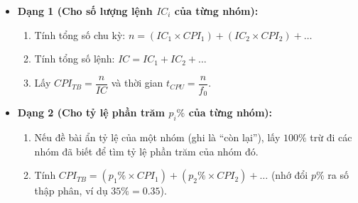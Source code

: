 \begin{tcolorbox}[bwbox, title=Quy trình giải bài toán có nhiều nhóm lệnh (Class A, B, C...)]
\begin{itemize}
    \item \textbf{Dạng 1 (Cho số lượng lệnh $IC_i$ của từng nhóm):}
    \begin{enumerate}
        \item Tính tổng số chu kỳ: $n = (IC_1 \times CPI_1) + (IC_2 \times CPI_2) + \dots$
        \item Tính tổng số lệnh: $IC = IC_1 + IC_2 + \dots$
        \item Lấy $CPI_{TB} = \dfrac{n}{IC}$ và thời gian $t_{CPU} = \dfrac{n}{f_0}$.
    \end{enumerate}
    \item \textbf{Dạng 2 (Cho tỷ lệ phần trăm $p_i\%$ của từng nhóm):}
    \begin{enumerate}
        \item Nếu đề bài ẩn tỷ lệ của một nhóm (ghi là ``còn lại''), lấy $100\%$ trừ đi các nhóm đã biết để tìm tỷ lệ phần trăm của nhóm đó.
        \item Tính $CPI_{TB} = (p_1\% \times CPI_1) + (p_2\% \times CPI_2) + \dots$ (nhớ đổi $p\%$ ra số thập phân, ví dụ $35\% = 0.35$).
    \end{enumerate}
\end{itemize}
\end{tcolorbox}

